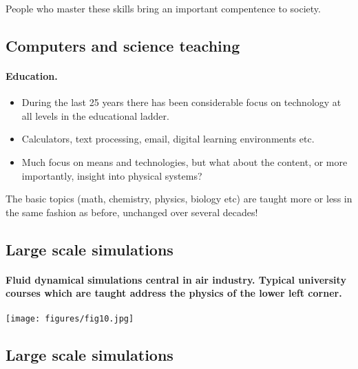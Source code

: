 \documentclass[%
twoside,                 %
final,                   %
10pt]{article}
\begin{document}
\noindent
People who master these skills bring an important compentence to society.



\subsection*{Computers and science teaching}

\paragraph{Education.}

\begin{itemize}
\item During the  last 25 years  there has been considerable focus on  technology at all levels in the educational ladder.

\item Calculators, text processing, email, digital learning environments etc.

\item Much focus on means and technologies, but what about the content, or more importantly, insight into  physical systems?
\end{itemize}

\noindent
The basic topics (math, chemistry, physics, biology etc) are taught more or less in the same fashion as before, unchanged over several decades!




\subsection*{Large scale simulations}

\paragraph{Fluid dynamical simulations central in air industry.  Typical university courses which are taught address the physics of the lower left corner.}


\centerline{\texttt{[image: figures/fig10.jpg]}}




\subsection*{Large scale simulations}
\end{document}
